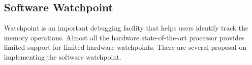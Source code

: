 \subsection{Software Watchpoint}
Watchpoint is an important debugging facility that helps users identify track the memory operations. Almost all the hardware state-of-the-art processor provides limited support for limited hardware watchpoints. There are several proposal on implementing the software watchpoint.


